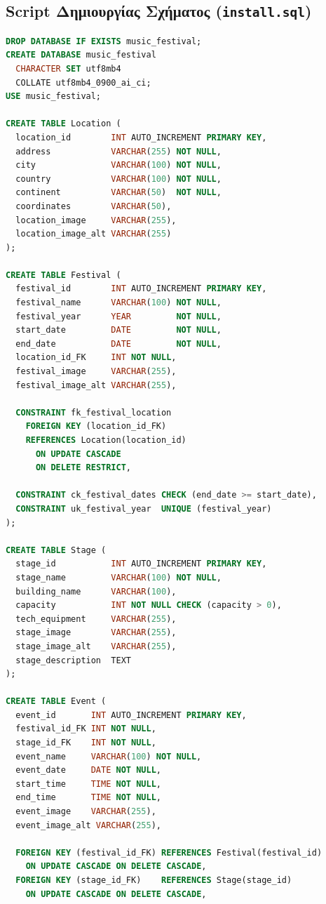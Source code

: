 \documentclass[a4paper,12pt]{article}
\begin{document}
\subsection{Script Δημιουργίας Σχήματος (\texttt{install.sql})}
\begin{lstlisting}[language=SQL]
DROP DATABASE IF EXISTS music_festival;
CREATE DATABASE music_festival
  CHARACTER SET utf8mb4
  COLLATE utf8mb4_0900_ai_ci;
USE music_festival;

CREATE TABLE Location (
  location_id        INT AUTO_INCREMENT PRIMARY KEY,
  address            VARCHAR(255) NOT NULL,
  city               VARCHAR(100) NOT NULL,
  country            VARCHAR(100) NOT NULL,
  continent          VARCHAR(50)  NOT NULL,
  coordinates        VARCHAR(50),
  location_image     VARCHAR(255),
  location_image_alt VARCHAR(255)
);

CREATE TABLE Festival (
  festival_id        INT AUTO_INCREMENT PRIMARY KEY,
  festival_name      VARCHAR(100) NOT NULL,
  festival_year      YEAR         NOT NULL,
  start_date         DATE         NOT NULL,
  end_date           DATE         NOT NULL,
  location_id_FK     INT NOT NULL,
  festival_image     VARCHAR(255),
  festival_image_alt VARCHAR(255),

  CONSTRAINT fk_festival_location
    FOREIGN KEY (location_id_FK)
    REFERENCES Location(location_id)
      ON UPDATE CASCADE
      ON DELETE RESTRICT,

  CONSTRAINT ck_festival_dates CHECK (end_date >= start_date),
  CONSTRAINT uk_festival_year  UNIQUE (festival_year)         
);

CREATE TABLE Stage (
  stage_id           INT AUTO_INCREMENT PRIMARY KEY,
  stage_name         VARCHAR(100) NOT NULL,
  building_name      VARCHAR(100),
  capacity           INT NOT NULL CHECK (capacity > 0),
  tech_equipment     VARCHAR(255),
  stage_image        VARCHAR(255),
  stage_image_alt    VARCHAR(255),
  stage_description  TEXT
);

CREATE TABLE Event (
  event_id       INT AUTO_INCREMENT PRIMARY KEY,
  festival_id_FK INT NOT NULL,
  stage_id_FK    INT NOT NULL,
  event_name     VARCHAR(100) NOT NULL,
  event_date     DATE NOT NULL,
  start_time     TIME NOT NULL,
  end_time       TIME NOT NULL,
  event_image    VARCHAR(255),
  event_image_alt VARCHAR(255),

  FOREIGN KEY (festival_id_FK) REFERENCES Festival(festival_id)
    ON UPDATE CASCADE ON DELETE CASCADE,
  FOREIGN KEY (stage_id_FK)    REFERENCES Stage(stage_id)
    ON UPDATE CASCADE ON DELETE CASCADE,


\end{lstlisting}
\end{document}
